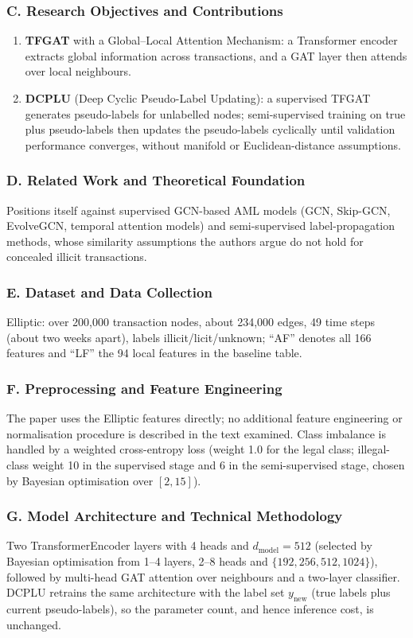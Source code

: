 \documentclass[11pt,a4paper]{article}
\begin{document}
\subsubsection*{C. Research Objectives and Contributions}
\begin{enumerate}[leftmargin=*]
    \item \textbf{TFGAT} with a Global--Local Attention Mechanism: a Transformer encoder extracts global information across transactions, and a GAT layer then attends over local neighbours.
    \item \textbf{DCPLU} (Deep Cyclic Pseudo-Label Updating): a supervised TFGAT generates pseudo-labels for unlabelled nodes; semi-supervised training on true plus pseudo-labels then updates the pseudo-labels cyclically until validation performance converges, without manifold or Euclidean-distance assumptions.
\end{enumerate}

\subsubsection*{D. Related Work and Theoretical Foundation}
Positions itself against supervised GCN-based AML models (GCN, Skip-GCN, EvolveGCN, temporal attention models) and semi-supervised label-propagation methods, whose similarity assumptions the authors argue do not hold for concealed illicit transactions.

\subsubsection*{E. Dataset and Data Collection}
Elliptic: over 200,000 transaction nodes, about 234,000 edges, 49 time steps (about two weeks apart), labels illicit/licit/unknown; ``AF'' denotes all 166 features and ``LF'' the 94 local features in the baseline table.

\subsubsection*{F. Preprocessing and Feature Engineering}
The paper uses the Elliptic features directly; no additional feature engineering or normalisation procedure is described in the text examined. Class imbalance is handled by a weighted cross-entropy loss (weight 1.0 for the legal class; illegal-class weight 10 in the supervised stage and 6 in the semi-supervised stage, chosen by Bayesian optimisation over $[2, 15]$).

\subsubsection*{G. Model Architecture and Technical Methodology}
Two TransformerEncoder layers with 4 heads and $d_{\text{model}}=512$ (selected by Bayesian optimisation from 1--4 layers, 2--8 heads and $\{192, 256, 512, 1024\}$), followed by multi-head GAT attention over neighbours and a two-layer classifier. DCPLU retrains the same architecture with the label set $y_{\text{new}}$ (true labels plus current pseudo-labels), so the parameter count, and hence inference cost, is unchanged.
\end{document}
